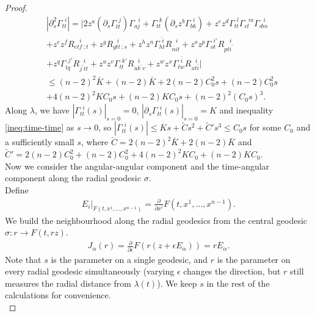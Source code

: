 \documentclass[pdflatex,sn-mathphys-num]{sn-jnl}
\theoremstyle{definition}
\begin{document}
\begin{proof}
\begin{align}
    & |\partial_{s}^2\Gamma_{tt}^{~~i}| = |2z^a(\partial_{s}\Gamma_{tt}^{~~j})\Gamma_{aj}^{~~~i} + \Gamma_{tt}^{~~k}(\partial_{s}z^b\Gamma_{bk}^{~~i}) + z^c z^d\Gamma_{tt}^{~~l}\Gamma_{cl}^{~~~m}\Gamma_{dm}^{~~~i}  \nonumber\\
    &+ z^e z^f R_{e t f~;t}^{~~~~i} + z^g R_{g t t~;s}^{~~~i} + z^h z^n \Gamma_{ht}^{~~\hat{i}} R_{n \hat{i} t}^{~~~i} + z^oz^p\Gamma_{o t}^{~~i'}R_{p t {i}^{'}}^{~~~~i} \nonumber\\
    &+ z^q \Gamma_{t q}^{~~j'}R_{{j}^{'} t t}^{~~~i} + z^u z^v \Gamma_{t t}^{~~k'}R_{u {k}^{'} v}^{~~~i} + z^w z^x\Gamma_{t w}^{~~\bar{i}}R_{x t \bar{i}}^{~~~i}| \nonumber\\
    & \leq (n-2)^2\bar{K} + (n-2)\bar{K} + 2(n-2)C_0^2s + (n-2)C_0^2s  \nonumber\\
    &  + 4(n-2)^2KC_0s + (n-2)KC_0s + (n-2)^2(C_0s)^3 \label{ineq:time-time}.
\end{align}
Along $\lambda$, we have $|\Gamma_{t t}^{~~i}(s)|_{s=0} = 0$, $|\partial_s\Gamma_{t t}^{~~i}(s)|_{s=0} = K$ and inequality \ref{ineq:time-time} as $s \rightarrow 0$, so $|\Gamma_{tt}^{~~i}(s)| \leq Ks + \tilde{C}s^2 + \tilde{C}'s^3 \leq C_0s$ for some $C_0$ and a sufficiently small $s$, where $\tilde{C} = 2(n-2)^2\bar{K} + 2(n-2)\bar{K}$ and $\tilde{C}' = 2(n-2)C_0^2 + (n-2)C_0^2 + 4(n-2)^2KC_0 + (n-2)KC_0$.\\

Now we consider the angular-angular component and the time-angular component along the radial geodesic $\sigma$.\\

Define
\begin{align*}
    E_i|_{F(t,x^1,\dots,x^{n-1})} = \frac{\partial}{\partial x^i}F(t,x^1,\dots,x^{n-1}).
\end{align*}
We build the neighbourhood along the radial geodesics from the central geodesic $\sigma: r \rightarrow F(t,rz)$.
\begin{align*}
    J_{\alpha}(r) = \frac{\partial}{\partial \epsilon}F(r(z + \epsilon E_{\alpha})) = rE_{\alpha}.
\end{align*}
Note that $s$ is the parameter on a single geodesic, and $r$ is the parameter on every radial geodesic simultaneously (varying $\epsilon$ changes the direction, but $r$ still measures the radial distance from $\lambda(t)$). We keep $s$ in the rest of the calculations for convenience.\\


\end{proof}
\end{document}
